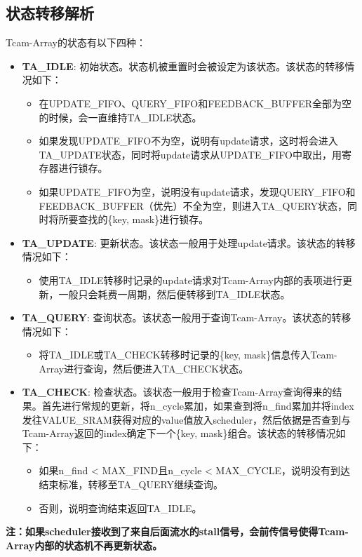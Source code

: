 \documentclass[lang=cn,11pt]{elegantpaper}
\begin{document}
\subsection{状态转移解析}
Tcam-Array的状态有以下四种：
\begin{itemize}
	\item \textbf{TA\_IDLE}: 初始状态。状态机被重置时会被设定为该状态。该状态的转移情况如下：
	\begin{itemize}
		\item 在UPDATE\_FIFO、QUERY\_FIFO和FEEDBACK\_BUFFER全部为空的时候，会一直维持TA\_IDLE状态。
		\item 如果发现UPDATE\_FIFO不为空，说明有update请求，这时将会进入TA\_UPDATE状态，同时将update请求从UPDATE\_FIFO中取出，用寄存器进行锁存。
		\item 如果UPDATE\_FIFO为空，说明没有update请求，发现QUERY\_FIFO和FEEDBACK\_BUFFER（优先）不全为空，则进入TA\_QUERY状态，同时将所要查找的\{key, mask\}进行锁存。
	\end{itemize}
	\item \textbf{TA\_UPDATE}: 更新状态。该状态一般用于处理update请求。该状态的转移情况如下：
	\begin{itemize}
		\item 使用TA\_IDLE转移时记录的update请求对Tcam-Array内部的表项进行更新，一般只会耗费一周期，然后便转移到TA\_IDLE状态。
	\end{itemize}
	\item \textbf{TA\_QUERY}: 查询状态。该状态一般用于查询Tcam-Array。该状态的转移情况如下：
	\begin{itemize}
		\item 将TA\_IDLE或TA\_CHECK转移时记录的\{key, mask\}信息传入Tcam-Array进行查询，然后便进入TA\_CHECK状态。
	\end{itemize}
	\item \textbf{TA\_CHECK}: 检查状态。该状态一般用于检查Tcam-Array查询得来的结果。首先进行常规的更新，将n\_cycle累加，如果查到将n\_find累加并将index发往VALUE\_SRAM获得对应的value值放入scheduler，然后依据是否查到与Tcam-Array返回的index确定下一个\{key, mask\}组合。该状态的转移情况如下：
	\begin{itemize}
		\item 如果n\_find < MAX\_FIND且n\_cycle < MAX\_CYCLE，说明没有到达结束标准，转移至TA\_QUERY继续查询。
		\item 否则，说明查询结束返回TA\_IDLE。
	\end{itemize}
\end{itemize}
\textbf{注：如果scheduler接收到了来自后面流水的stall信号，会前传信号使得Tcam-Array内部的状态机不再更新状态。}
\end{document}
